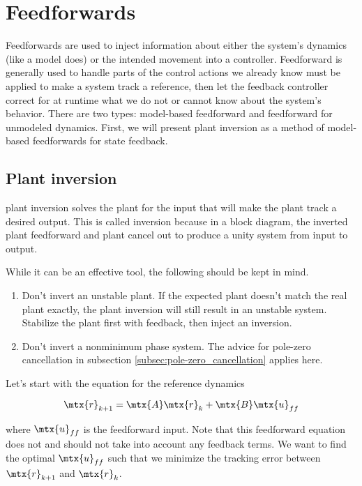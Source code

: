 \section{Feedforwards}

Feedforwards are used to inject information about either the \gls{system}'s
dynamics (like a \gls{model} does) or the intended movement into a controller.
Feedforward is generally used to handle parts of the control actions we already
know must be applied to make a \gls{system} track a \gls{reference}, then let
the feedback controller correct for at runtime what we do not or cannot know
about the \gls{system}'s behavior. There are two types: model-based feedforward
and feedforward for unmodeled dynamics. First, we will present \gls{plant}
inversion as a method of model-based feedforwards for \gls{state} feedback.

\subsection{Plant inversion}
\label{subsec:plant_inversion}

\Gls{plant} inversion solves the \gls{plant} for the input that will make the
\gls{plant} track a desired output. This is called inversion because in a block
diagram, the inverted \gls{plant} feedforward and \gls{plant} cancel out to
produce a unity system from input to output.

While it can be an effective tool, the following should be kept in mind.

\begin{enumerate}
  \item Don't invert an unstable \gls{plant}. If the expected \gls{plant}
    doesn't match the real \gls{plant} exactly, the \gls{plant} inversion will
    still result in an unstable \gls{system}. Stabilize the \gls{plant} first
    with feedback, then inject an inversion.
  \item Don't invert a nonminimum phase system. The advice for pole-zero
    cancellation in subsection \ref{subsec:pole-zero_cancellation} applies here.
\end{enumerate}

Let's start with the equation for the \gls{reference} dynamics

\begin{equation*}
  \mtx{r}_{k+1} = \mtx{A}\mtx{r}_k + \mtx{B}\mtx{u}_{ff}
\end{equation*}

where $\mtx{u}_{ff}$ is the feedforward input. Note that this feedforward
equation does not and should not take into account any feedback terms. We want
to find the optimal $\mtx{u}_{ff}$ such that we minimize the \gls{tracking}
error between $\mtx{r}_{k+1}$ and $\mtx{r}_k$.

